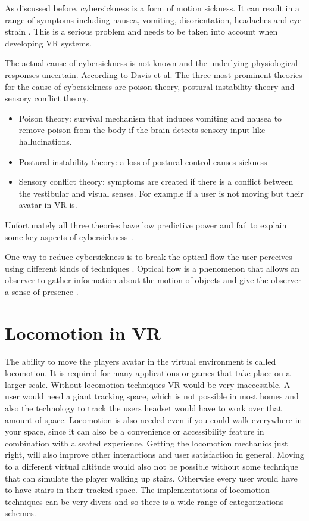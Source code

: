 As discussed before, cybersickness is a form of motion sickness. It can
result in a range of symptoms including nausea, vomiting,
disorientation, headaches and eye strain
\cite{LaViola}. This is a serious problem and needs to
be taken into account when developing VR systems.

The actual cause of cybersickness is not
known and the underlying physiological responses uncertain. According to Davis et al. \cite{Davis} The three
most prominent theories for the cause of cybersickness are poison
theory, postural instability theory and sensory conflict theory.

\begin{itemize}
\itemsep1pt\parskip0pt
\item
  Poison theory: survival mechanism that induces vomiting and nausea to
  remove poison from the body if the brain detects sensory input like
  hallucinations.\\
\item
  Postural instability theory: a loss of postural control causes
  sickness\\
\item
  Sensory conflict theory: symptoms are created if there is a conflict
  between the vestibular and visual senses. For example if a user is not
  moving but their avatar in VR is.
\end{itemize}

Unfortunately all three theories have low predictive power and fail to
explain some key aspects of cybersickness~\cite{Davis}.

One way to reduce cybersickness is to break the optical flow the user
perceives using different kinds of techniques
\cite{Bhandari}. Optical flow is a phenomenon that
allows an observer to gather information about the motion of objects and
give the observer a sense of presence \cite{Gibson}.

\section{Locomotion in VR}\label{locomotion-in-vr}
The ability to move the players avatar in the virtual environment is
called locomotion. It is required for many applications or games that
take place on a larger scale. Without locomotion techniques VR would be
very inaccessible. A user would need a giant tracking space, which is
not possible in most homes and also the technology to track the users
headset would have to work over that amount of space. Locomotion is also
needed even if you could walk everywhere in your space, since it can
also be a convenience or accessibility feature in combination with a
seated experience. Getting the locomotion mechanics just right, will
also improve other interactions and user satisfaction in general. Moving
to a different virtual altitude would also not be possible without some
technique that can simulate the player walking up stairs. Otherwise
every user would have to have stairs in their tracked space. The
implementations of locomotion techniques can be very divers and so there
is a wide range of categorizations schemes.

